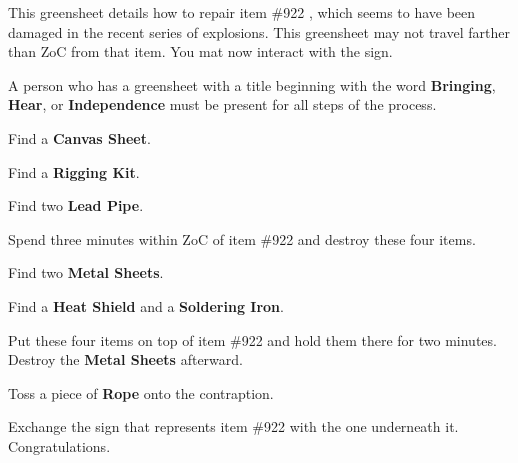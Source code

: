 \documentclass[green]{airship}
\begin{document}
\name{\gCayman{}}

This greensheet details how to repair item \#922 , which seems to have been damaged in the recent series of explosions. This greensheet may not travel farther than ZoC from that item. You mat now interact with the sign.

\begin{enum}
  \item A person who has a greensheet with a title beginning with the word {\bf Bringing}, {\bf Hear}, or {\bf Independence} must be present for all steps of the process.
  \item Find a {\bf Canvas Sheet}.
  \item Find a {\bf Rigging Kit}.
  \item Find two {\bf Lead Pipe}.
  \item Spend three minutes within ZoC of item \#922 and destroy these four items.
  \item Find two {\bf Metal Sheets}.
  \item Find a {\bf Heat Shield} and a {\bf Soldering Iron}.
  \item Put these four items on top of item \#922 and hold them there for two minutes. Destroy the {\bf Metal Sheets} afterward.
  \item Toss a piece of {\bf Rope} onto the contraption.
  \item Exchange the sign that represents item \#922 with the one underneath it. Congratulations.
\end{enum}
\end{document}

